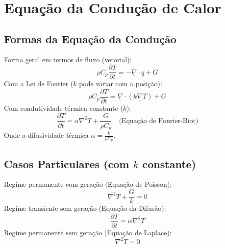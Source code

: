 \documentclass[12pt, a4paper]{article}
\begin{document}
\newpage

\section{Equação da Condução de Calor}

\subsection{Formas da Equação da Condução}
Forma geral em termos de fluxo (vetorial):
\begin{equation}
    \rho C_p \frac{\partial T}{\partial t} = -\underline{\nabla} \cdot \underline{q} + G
\end{equation}
Com a Lei de Fourier ($k$ pode variar com a posição):
\begin{equation}
    \rho C_p \frac{\partial T}{\partial t} = \underline{\nabla} \cdot (k \underline{\nabla} T) + G
\end{equation}
Com condutividade térmica constante ($k$):
\begin{equation}
    \frac{\partial T}{\partial t} = \alpha \nabla^2 T + \frac{G}{\rho C_p} \quad \text{(Equação de Fourier-Biot)}
\end{equation}
Onde a difusividade térmica $\alpha = \frac{k}{\rho C_p}$.

\subsection{Casos Particulares (com $k$ constante)}
Regime permanente com geração (Equação de Poisson):
\begin{equation}
    \nabla^2 T + \frac{G}{k} = 0
\end{equation}
Regime transiente sem geração (Equação da Difusão):
\begin{equation}
    \frac{\partial T}{\partial t} = \alpha \nabla^2 T
\end{equation}
Regime permanente sem geração (Equação de Laplace):
\begin{equation}
    \nabla^2 T = 0
\end{equation}
\end{document}
